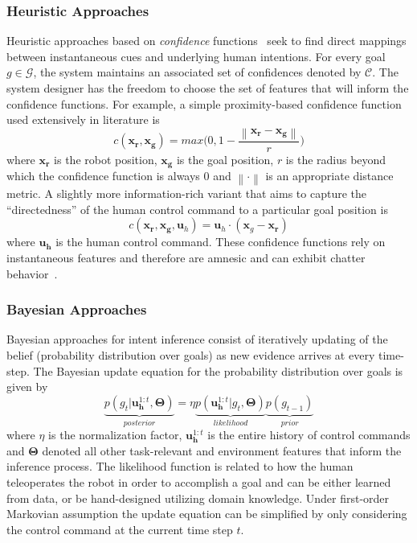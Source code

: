 \documentclass[conference]{IEEEtran}
\newcommand{\norm}[1]{\left\lVert#1\right\rVert}
\begin{document}
\subsubsection{Heuristic Approaches}
Heuristic approaches based on \textit{confidence} functions~\citep{dragan2013policy} seek to find direct mappings between instantaneous cues and underlying human intentions. For every goal $g \in \mathcal{G}$, the system maintains an associated set of confidences denoted by $\mathcal{C}$. The system designer has the freedom to choose the set of features that will inform the confidence functions. For example, a simple proximity-based confidence function used extensively in literature is
\begin{equation*}
c(\boldsymbol{x_r}, \boldsymbol{x_g}) = max\Big(0, 1 - \frac{\norm{\boldsymbol{x_r} - \boldsymbol{x_g}}}{r}\Big)
\end{equation*}
where $\boldsymbol{x_r}$ is the robot position, $\boldsymbol{x_g}$ is the goal position, $r$ is the radius beyond which the confidence function is always 0 and $\norm{\cdot}$ is an appropriate distance metric. 
A slightly more information-rich variant that aims to capture the ``directedness'' of the human control command to a particular goal position is
\begin{equation*}
c({\boldsymbol{x_r},\boldsymbol{x_g}, \boldsymbol{u}_{h}}) = \boldsymbol{u}_h\cdot(\boldsymbol{x}_{g} - \boldsymbol{x_r})
\end{equation*}
where $\boldsymbol{u_h}$ is the human control command. These confidence functions rely on instantaneous features and therefore are amnesic and can exhibit chatter behavior~\citep{dragan2012formalizing}.

\subsubsection{Bayesian Approaches}
Bayesian approaches for intent inference consist of iteratively updating of the belief (probability distribution over goals) as new evidence arrives at every time-step. The Bayesian update equation for the probability distribution over goals is given by
\begin{equation*}
\underbrace{p(g_t| \boldsymbol{u}^{1:t}_{\boldsymbol{h}}, \boldsymbol{\Theta})}_{posterior} = \eta \underbrace{p(\boldsymbol{u}^{1:t}_{\boldsymbol{h}} | g_t, \boldsymbol{\Theta})}_{likelihood}\underbrace{p(g_{t-1})}_{prior}
\end{equation*}
where $\eta$ is the normalization factor, $\boldsymbol{u}^{1:t}_{\boldsymbol{h}}$ is the entire history of control commands and $\boldsymbol{\Theta}$ denoted all other task-relevant and environment features that inform the inference process. The likelihood function is related to how the human teleoperates the robot in order to accomplish a goal and can be either learned from data, or be hand-designed utilizing domain knowledge. Under first-order Markovian assumption the update equation can be simplified by only considering the control command at the current time step $t$. 
\end{document}
